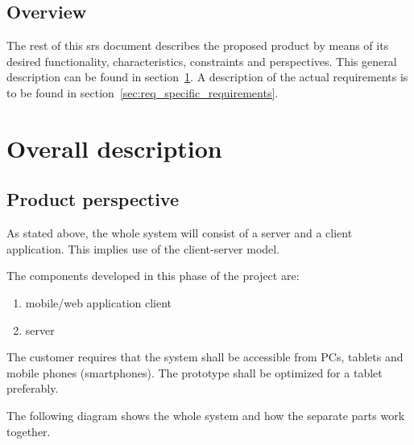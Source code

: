 \documentclass[11pt]{book}
\begin{document}
\subsection{Overview}
The rest of this \gls{srs} document describes the proposed product by means of its desired functionality, characteristics, constraints and perspectives. This general description can be found in section~\ref{sec:req_overall_description}. A description of the actual requirements is to be found in section~\ref{sec:req_specific_requirements}.

\section{Overall description}\label{sec:req_overall_description}
\subsection{Product perspective}
As stated above, the whole system will consist of a server and a client application. This implies use of the client-server model.

The components developed in this phase of the project are:

\begin{enumerate}
  \item mobile/web application client
  \item server
\end{enumerate}

The customer requires that the system shall be accessible from PCs, tablets and mobile phones (smartphones). The prototype shall be optimized for a tablet preferably.

The following diagram shows the whole system and how the separate parts work together.
\end{document}
